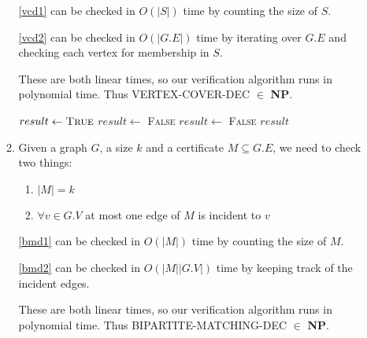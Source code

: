 \documentclass[12pt,letterpaper]{article}
\begin{document}
\begin{enumerate}
\begin{enumerate}
          \ref{vcd1} can be checked in $O(|S|)$ time by counting the size of $S$.

          \ref{vcd2} can be checked in $O(|G.E|)$ time by iterating over $G.E$ and checking each vertex for membership in $S$.

          These are both linear times, so our verification algorithm runs in polynomial time.
          Thus VERTEX-COVER-DEC $\in$ \textbf{NP}.

          \begin{algorithm}
            \begin{algorithmic}
                \State $result \gets \textsc{True}$
                  \State $result \gets$ \textsc{False}
                \Else
                      \State $result \gets$ \textsc{False}
                    \EndIf
                  \EndFor
                \EndIf
                \State \Return $result$
              \EndFunction
            \end{algorithmic}
          \end{algorithm}

        \item
          Given a graph $G$, a size $k$ and a certificate $M \subseteq G.E$,
          we need to check two things:
          \begin{enumerate}
            \item $|M| = k$ \label{bmd1}
            \item $\forall v \in G.V$ at most one edge of $M$ is incident to $v$ \label{bmd2}
          \end{enumerate}

          \ref{bmd1} can be checked in $O(|M|)$ time by counting the size of $M$.

          \ref{bmd2} can be checked in $O(|M||G.V|)$ time by keeping track of the incident edges.

          These are both linear times, so our verification algorithm runs in polynomial time.
          Thus BIPARTITE-MATCHING-DEC $\in$ \textbf{NP}.


\end{enumerate}
\end{enumerate}
\end{document}
